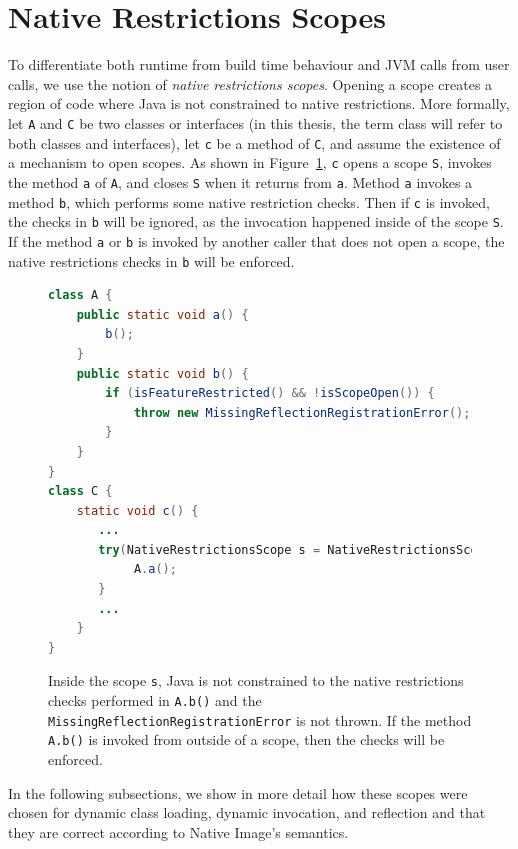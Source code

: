 \section{Native Restrictions Scopes}
To differentiate both runtime from build time behaviour and JVM calls from user calls, we use the notion of \emph{native restrictions scopes}. Opening a scope creates a region of code where Java is not constrained to native restrictions. 
More formally, let \verb|A| and \verb|C| be two classes or interfaces (in this thesis, the term class will refer to both classes and interfaces), let \verb|c| be a method of \verb|C|, and assume the existence of a mechanism to open scopes. As shown in Figure~\ref{fig:scopes}, \verb|c| opens a scope \verb|S|, invokes the method \verb|a| of \verb|A|, and closes \verb|S| when it returns from \verb|a|. Method \verb|a| invokes a method \verb|b|, which performs some native restriction checks.
Then if \verb|c| is invoked, the checks in \verb|b| will be ignored, as the invocation happened inside of the scope \verb|S|.
If the method \verb|a| or \verb|b| is invoked by another caller that does not open a scope, the native restrictions checks in \verb|b| will be enforced.

\begin{figure}[ht]
    \centering
\begin{lstlisting}[language=Java]
class A {
    public static void a() {
        b(); 
    }
    public static void b() {
        if (isFeatureRestricted() && !isScopeOpen()) {
            throw new MissingReflectionRegistrationError();
        }
    }
} 
class C {
    static void c() {
       ...
       try(NativeRestrictionsScope s = NativeRestrictionsScope.openScope()) {
            A.a();
       }
       ...
    }
}
\end{lstlisting}
    \caption{Inside the scope \texttt{s}, Java is not constrained to the native restrictions checks performed in \texttt{A.b()} and the \texttt{MissingReflectionRegistrationError} is not thrown. If the method \texttt{A.b()} is invoked from outside of a scope, then the checks will be enforced.}
    \label{fig:scopes}
\end{figure}

In the following subsections, we show in more detail how these scopes were chosen for dynamic class loading, dynamic invocation, and reflection and that they are correct according to Native Image's semantics.

